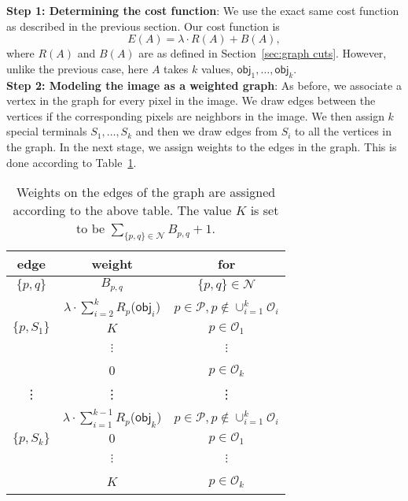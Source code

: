 \documentclass{acm}
\newcommand{\setpixels}{\mathcal{P}}
\newcommand{\setobj}{\mathcal{O}}
\newcommand{\obj}{\mathsf{obj}}
\newcommand{\setneighbors}{\mathcal{N}}
\begin{document}
\noindent \textbf{Step 1: Determining the cost function}: We use the exact same cost function as described in the previous section. Our cost function is 
$$E(A)= \lambda \cdot R(A) + B(A), $$
where $R(A)$ and $B(A)$ are as defined in Section~\ref{sec:graph cuts}. However, unlike the previous case, here $A$ takes $k$ values, $\obj_1,\ldots,\obj_k$. \\

\noindent \textbf{Step 2: Modeling the image as a weighted graph}: As before, we associate a vertex in the graph for every pixel in the image. We draw edges between the vertices if the corresponding pixels are neighbors in the image. We then assign $k$ special terminals $S_1,\ldots,S_k$ and then we draw edges from $S_i$ to all the vertices in the graph. In the next stage, we assign weights to the edges in the graph. This is done according to Table~\ref{fig:table1}. 

\begin{table}[ht]
\begin{tabular}{| c | c | c |}
  \hline
  \textbf{edge} & \textbf{weight} & \textbf{for} \\ \hline \hline
  $\{p,q\}$ & $B_{p,q}$ & $\{p,q\} \in \setneighbors$ \\ \hline
  \ & $\lambda \cdot \sum_{i=2}^{k} R_p$($\obj_i$) & $p \in \setpixels, p \notin \cup_{i=1}^{k} \setobj_i$  \\ \cline{2-3}
  $\{p,S_1\}$ & $K$ & $p \in \setobj_1$ \\ \cline{2-3}
 \ & $\vdots$ & $\vdots$ \\ \cline{2-3}
  \ & $0$ & $p \in \setobj_k$ \\
  \hline
  \vdots & \vdots & \vdots \\
  \hline
  \ & $\lambda \cdot \sum_{i=1}^{k-1} R_p$($\obj_k$) & $p \in \setpixels, p \notin \cup_{i=1}^{k} \setobj_i$  \\ \cline{2-3}
  $\{p,S_k\}$ & $0$ & $p \in \setobj_1$ \\ \cline{2-3}
  \ & $\vdots$ & $\vdots$ \\ \cline{2-3}
  \ & $K$ & $p \in \setobj_k$ \\
  \hline
\end{tabular}
\caption{Weights on the edges of the graph are assigned according to the above table. The value $K$ is set to be $\sum_{\{p,q\} \in \setneighbors} {B_{p,q}}+1$.}
\label{fig:table1}
\end{table} 
\end{document}
